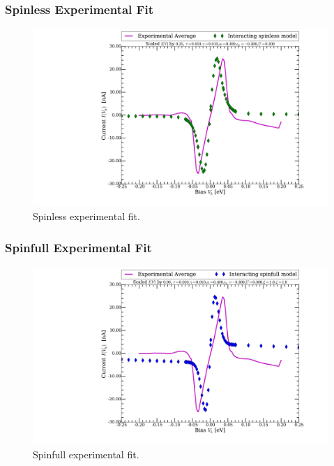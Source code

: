 \begin{frame}
    \frametitle{Spinless Experimental Fit}
    \vspace{-3mm}
    \begin{figure}[!b] 
        \centering
        \includegraphics[height=.75\textheight, width=\textwidth, clip=true, trim=6cm 0cm 0cm 0cm]{res/spinless.pdf}
        \vspace{-6mm}
        \caption{Spinless experimental fit.}
    \end{figure} 
\end{frame}
\begin{frame}
    \frametitle{Spinfull Experimental Fit}
    \vspace{-3mm}
    \begin{figure}[!b] 
        \centering
        \includegraphics[height=.75\textheight, width=\textwidth, clip=true, trim=6cm 0cm 0cm 0cm]{res/spinfull.pdf}
        \vspace{-6mm}
        \caption{Spinfull experimental fit.}
    \end{figure} 
\end{frame}
